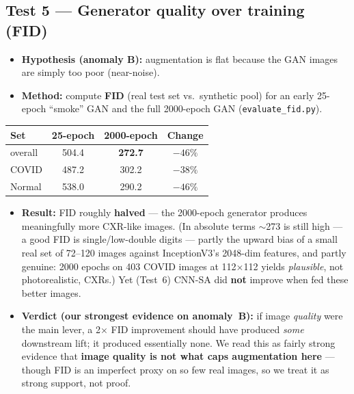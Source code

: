 \documentclass[11pt]{article}
\newcommand{\code}[1]{\texttt{#1}}
\begin{document}
\subsection{Test 5 --- Generator quality over training (FID)}
\begin{itemize}[nosep,leftmargin=1.4em]
  \item \textbf{Hypothesis (anomaly B):} augmentation is flat because the GAN
        images are simply too poor (near-noise).
  \item \textbf{Method:} compute \textbf{FID} (real test set vs.\ synthetic pool)
        for an early 25-epoch ``smoke'' GAN and the full 2000-epoch GAN
        (\code{evaluate\_fid.py}).
\end{itemize}

\begin{table}[htbp]
\centering
\begin{tabular}{@{}lccc@{}}
\toprule
\textbf{Set} & \textbf{25-epoch} & \textbf{2000-epoch} & \textbf{Change} \\
\midrule
overall & 504.4 & \textbf{272.7} & $-46\%$ \\
COVID   & 487.2 & 302.2 & $-38\%$ \\
Normal  & 538.0 & 290.2 & $-46\%$ \\
\bottomrule
\end{tabular}
\end{table}

\begin{itemize}[nosep,leftmargin=1.4em]
  \item \textbf{Result:} FID roughly \textbf{halved} --- the 2000-epoch generator
        produces meaningfully more CXR-like images. (In absolute terms $\sim$273 is
        still high --- a good FID is single/low-double digits --- partly the upward
        bias of a small real set of 72--120 images against InceptionV3's 2048-dim
        features, and partly genuine: 2000 epochs on 403 COVID images at
        112$\times$112 yields \emph{plausible}, not photorealistic, CXRs.) Yet
        (Test~6) CNN-SA did \textbf{not} improve when fed these better images.
  \item \textbf{Verdict (our strongest evidence on anomaly~B):} if image
        \emph{quality} were the main lever, a 2$\times$ FID improvement should have
        produced \emph{some} downstream lift; it produced essentially none. We read
        this as fairly strong evidence that \textbf{image quality is not what caps
        augmentation here} --- though FID is an imperfect proxy on so few real
        images, so we treat it as strong support, not proof.
\end{itemize}
\end{document}
